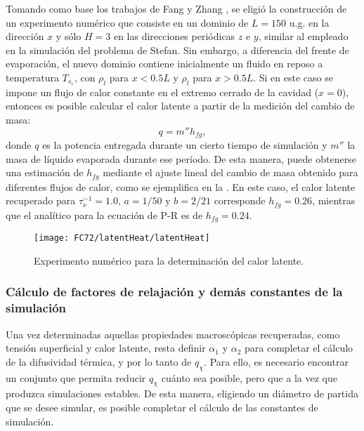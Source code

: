 Tomando como base los trabajos de Fang \cite{fang_lattice_2017} y Zhang \cite{zhang_simulation_2015}, se eligi\'o la construcci\'on de un experimento num\'erico que consiste en un dominio de $L=150$ u.g. en la direcci\'on $x$ y s\'olo $H=3$ en las direcciones peri\'odicas $z$ e $y$, similar al empleado en la simulaci\'on del problema de Stefan. Sin embargo, a diferencia del frente de evaporaci\'on, el nuevo dominio contiene inicialmente un fluido en reposo a temperatura $T_{s_r}$, con $\rho_l$ para $x<0.5L$ y $\rho_l$ para $x>0.5L$. Si en este caso se impone un flujo de calor constante en el extremo cerrado de la cavidad ($x=0$), entonces es posible calcular el calor latente a partir de la medici\'on del cambio de masa:
\begin{equation}
	q = m'' h_{fg},
\end{equation}
donde $q$ es la potencia entregada durante un cierto tiempo de simulaci\'on y $m''$ la masa de l\'iquido evaporada durante ese per\'iodo. De esta manera, puede obtenerse una estimaci\'on de $h_{fg}$ mediante el ajuste lineal del cambio de masa obtenido para diferentes flujos de calor, como se ejemplifica en la . En este caso, el calor latente recuperado para $\tau_{\nu}^{-1}=1.0$, $a=1/50$ y $b=2/21$ corresponde $h_{fg}=0.26$, mientras que el anal\'itico para la ecuaci\'on de P-R \cite{peng_new_1976} es de $h_{fg}=0.24$.

\begin{figure}[ht]
	\centering
	\texttt{[image: FC72/latentHeat/latentHeat]}
	\caption{Experimento num\'erico para la determinaci\'on del calor latente.}
	\label{fig:calor_latente_3D}
\end{figure}


\subsubsection{C\'alculo de factores de relajaci\'on y dem\'as constantes de la simulaci\'on}

Una vez determinadas aquellas propiedades macrosc\'opicas recuperadas, como tensi\'on superficial y calor latente, resta definir $\alpha_1$ y $\alpha_2$ para completar el c\'alculo de la difusividad t\'ermica, y por lo tanto de $q_{\chi}$. Para ello, es necesario encontrar un conjunto que permita reducir $q_{\chi}$ cu\'anto sea posible, pero que a la vez que produzca simulaciones estables. De esta manera, eligiendo un di\'ametro de partida que se desee simular, es posible completar el c\'alculo de las constantes de simulaci\'on. 

